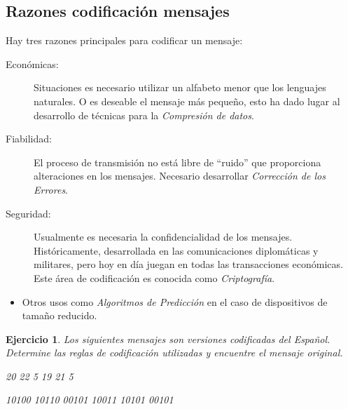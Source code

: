 \documentclass{beamer}
\newtheorem{ejercicio} [Corolario]{Ejercicio}
\begin{document}

\subsection{Razones codificación mensajes}
\begin{frame}
Hay tres razones principales para codificar un mensaje:

\small
\begin{description}

\item[Económicas:] Situaciones es necesario utilizar un alfabeto menor que los lenguajes naturales. O es deseable el mensaje más pequeño, esto ha dado lugar al desarrollo de técnicas  para la \textit{Compresión de datos}. 

\item[Fiabilidad:] El proceso de transmisión no está libre de ``ruido'' que proporciona alteraciones en los mensajes. Necesario desarrollar \textit{Corrección de los Errores}.


\item[Seguridad:] Usualmente es necesaria la confidencialidad de los mensajes. Históricamente, desarrollada en las comunicaciones diplomáticas y militares, pero hoy en día juegan en todas las transacciones económicas.  Este área de codificación es conocida como \textit{Criptografía}. 
\end{description}


\end{frame}



\begin{frame} 

\small

\begin{itemize}
\item Otros usos como \textit{Algoritmos de Predicción} en el caso de dispositivos de tamaño reducido.

\end{itemize}


\begin{ejercicio}
 Los siguientes mensajes son versiones codificadas del Español. Determine las reglas de codificación utilizadas y encuentre el mensaje original.

\begin{center}
20     22     5     19     21    5
\end{center}

\begin{center}
10100	10110	00101	10011		10101		00101
\end{center}	

\end{ejercicio}

\end{frame}
\end{document}
